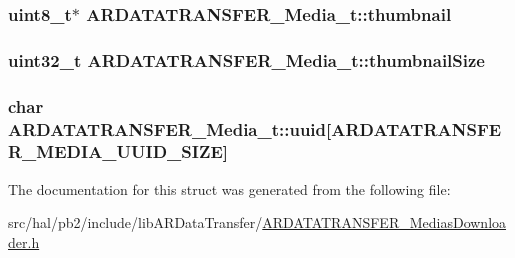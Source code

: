 \subsubsection[{\texorpdfstring{thumbnail}{thumbnail}}]{\setlength{\rightskip}{0pt plus 5cm}uint8\+\_\+t$\ast$ A\+R\+D\+A\+T\+A\+T\+R\+A\+N\+S\+F\+E\+R\+\_\+\+Media\+\_\+t\+::thumbnail}\hypertarget{struct_a_r_d_a_t_a_t_r_a_n_s_f_e_r___media__t_a81df58d6d6f8f4f3ffae0d214eef5ed5}{}\label{struct_a_r_d_a_t_a_t_r_a_n_s_f_e_r___media__t_a81df58d6d6f8f4f3ffae0d214eef5ed5}
\subsubsection[{\texorpdfstring{thumbnail\+Size}{thumbnailSize}}]{\setlength{\rightskip}{0pt plus 5cm}uint32\+\_\+t A\+R\+D\+A\+T\+A\+T\+R\+A\+N\+S\+F\+E\+R\+\_\+\+Media\+\_\+t\+::thumbnail\+Size}\hypertarget{struct_a_r_d_a_t_a_t_r_a_n_s_f_e_r___media__t_ab4c46c599c8ef7c8e2493b78e0fdd375}{}\label{struct_a_r_d_a_t_a_t_r_a_n_s_f_e_r___media__t_ab4c46c599c8ef7c8e2493b78e0fdd375}
\subsubsection[{\texorpdfstring{uuid}{uuid}}]{\setlength{\rightskip}{0pt plus 5cm}char A\+R\+D\+A\+T\+A\+T\+R\+A\+N\+S\+F\+E\+R\+\_\+\+Media\+\_\+t\+::uuid\mbox{[}{\bf A\+R\+D\+A\+T\+A\+T\+R\+A\+N\+S\+F\+E\+R\+\_\+\+M\+E\+D\+I\+A\+\_\+\+U\+U\+I\+D\+\_\+\+S\+I\+ZE}\mbox{]}}\hypertarget{struct_a_r_d_a_t_a_t_r_a_n_s_f_e_r___media__t_a243226914bc41bb7cd98e05dce8ec1ce}{}\label{struct_a_r_d_a_t_a_t_r_a_n_s_f_e_r___media__t_a243226914bc41bb7cd98e05dce8ec1ce}


The documentation for this struct was generated from the following file\+:\begin{DoxyCompactItemize}
\item 
src/hal/pb2/include/lib\+A\+R\+Data\+Transfer/\hyperlink{_a_r_d_a_t_a_t_r_a_n_s_f_e_r___medias_downloader_8h}{A\+R\+D\+A\+T\+A\+T\+R\+A\+N\+S\+F\+E\+R\+\_\+\+Medias\+Downloader.\+h}\end{DoxyCompactItemize}

